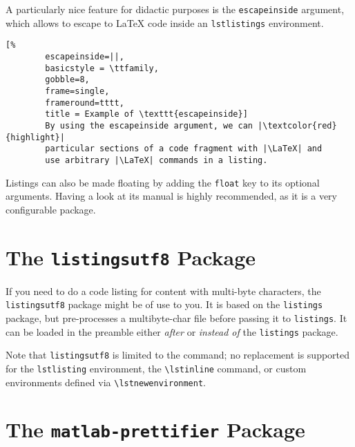 \documentclass[article,a4paper,oneside,10pt]{memoir}
\newcommand\code[1]{\texttt{#1}}
\begin{document}
A particularly nice  feature for didactic purposes  is the \code{escapeinside}
argument, which allows to escape to \LaTeX{} code inside an \code{lstlistings}
environment.

\vfill

\begin{tcblisting}{}
    \begin{lstlisting}[%
        escapeinside=||,
        basicstyle = \ttfamily,
        gobble=8,
        frame=single,
        frameround=tttt,
        title = Example of \texttt{escapeinside}]
        By using the escapeinside argument, we can |\textcolor{red}{highlight}| 
        particular sections of a code fragment with |\LaTeX| and 
        use arbitrary |\LaTeX| commands in a listing.
    \end{lstlisting}
\end{tcblisting}

\vfill

Listings  can also  be made  floating by  adding the  \code{float} key  to its
optional arguments. Having a  look at its manual is highly  recommended, as it
is a very configurable package.


\newpage
\chapter{The \code{listingsutf8}  Package \cite{listingsutf8}}
\label{chap:listingsutf8}

If you need to  do a code listing for content  with multi-byte characters, the
\code{listingsutf8}  package might  be  of  use to  you. It  is  based on  the
\code{listings}  package,  but  pre-processes  a  multibyte-char  file  before
passing  it  to \code{listings}. It  can  be  loaded  in the  preamble  either
\emph{after} or \emph{instead of} the \code{listings} package.

Note  that  \code{listingsutf8}  is  limited  to  the  \verb||
command; no  replacement is  supported for the  \code{lstlisting} environment,
the   \verb|\lstinline|   command,   or  custom   environments   defined   via
\verb|\lstnewenvironment|.


\chapter{The \code{matlab-prettifier} Package \cite{mlpretty}}
\label{chap:mlpretty}
\end{document}
